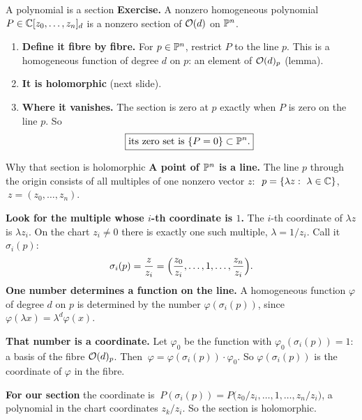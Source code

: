 \begin{frame}{A polynomial is a section}
\label{fr:prov-od-3}
\textbf{Exercise.} A nonzero homogeneous polynomial \(P\in\mathbb C[z_0,\ldots,z_n]_d\) is a nonzero section of \(\mathcal O(d)\) on \(\mathbb P^n\).
\par\medskip
\begin{enumerate}
\setlength{\itemsep}{12pt}
\item \textbf{Define it fibre by fibre.} For \(p\in\mathbb P^n\), restrict \(P\) to the line \(p\). This is a homogeneous function of degree \(d\) on \(p\): an element of \(\mathcal O(d)_p\) (lemma).
\item \textbf{It is holomorphic} (next slide).
\item \textbf{Where it vanishes.} The section is zero at \(p\) exactly when \(P\) is zero on the line \(p\). So
\[
\boxed{\text{its zero set is } \{P=0\}\subset\mathbb P^n .}
\]
\end{enumerate}
\end{frame}

\begin{frame}{Why that section is holomorphic}
\label{fr:prov-od-3b}
\textbf{A point of \(\mathbb P^n\) is a line.} The line \(p\) through the origin consists of all multiples of one nonzero vector \(z\): \(\ p=\{\lambda z:\ \lambda\in\mathbb C\}\), \(\ z=(z_0,\ldots,z_n)\).
\par\smallskip
\textbf{Look for the multiple whose \(i\)-th coordinate is \(1\).} The \(i\)-th coordinate of \(\lambda z\) is \(\lambda z_i\). On the chart \(z_i\ne0\) there is exactly one such multiple, \(\lambda=1/z_i\). Call it \(\sigma_i(p)\):
\[
\sigma_i(p)=\frac{z}{z_i}=\Bigl(\frac{z_0}{z_i},\ldots,1,\ldots,\frac{z_n}{z_i}\Bigr).
\]
\textbf{One number determines a function on the line.} A homogeneous function \(\varphi\) of degree \(d\) on \(p\) is determined by the number \(\varphi(\sigma_i(p))\), since \(\varphi(\lambda x)=\lambda^d\varphi(x)\).
\par\smallskip
\textbf{That number is a coordinate.} Let \(\varphi_0\) be the function with \(\varphi_0(\sigma_i(p))=1\): a basis of the fibre \(\mathcal O(d)_p\). Then \(\ \varphi=\varphi(\sigma_i(p))\cdot\varphi_0\). So \(\varphi(\sigma_i(p))\) is the coordinate of \(\varphi\) in the fibre.
\par\smallskip
\textbf{For our section} the coordinate is \(\ P(\sigma_i(p))=P\bigl(z_0/z_i,\ldots,1,\ldots,z_n/z_i\bigr)\), a polynomial in the chart coordinates \(z_k/z_i\). So the section is holomorphic.
\end{frame}




